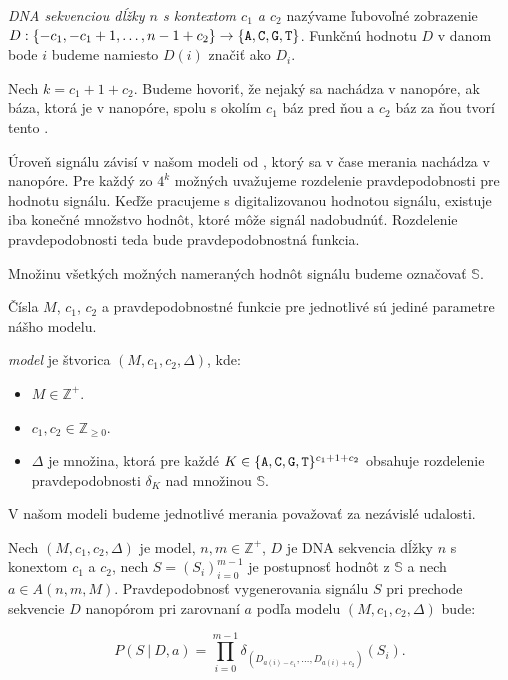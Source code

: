 \begin{definicia}

\emph{DNA sekvenciou dĺžky $n$ s kontextom $c_1$ a $c_2$} nazývame ľubovoľné zobrazenie 
$D: \{-c_1, -c_1+1, \dots, n-1+c_2\} \rightarrow \{\texttt{A}, \texttt{C}, \texttt{G}, \texttt{T}\}$. Funkčnú hodnotu $D$ v danom bode $i$
budeme namiesto $D(i)$ značiť ako $D_i$.

\end{definicia}

Nech $k = c_1 + 1 + c_2$. Budeme hovoriť, že nejaký \kmer{} sa nachádza v nanopóre, ak báza, 
ktorá je v nanopóre, spolu s okolím $c_1$ báz pred ňou a $c_2$ báz za ňou tvorí tento \kmer{}.

Úroveň signálu závisí v našom modeli od , ktorý sa v čase merania nachádza v nanopóre.
Pre každý zo $4^k$ možných  uvažujeme rozdelenie 
pravdepodobnosti pre hodnotu signálu.
Keďže pracujeme s digitalizovanou hodnotou signálu, existuje iba konečné množstvo hodnôt, ktoré
môže signál nadobudnúť. Rozdelenie pravdepodobnosti teda bude pravdepodobnostná funkcia.

\begin{definicia}

Množinu všetkých možných nameraných hodnôt signálu budeme označovať $\mathbb{S}$.

\end{definicia}

Čísla $M$, $c_1$, $c_2$ a pravdepodobnostné funkcie pre jednotlivé  sú jediné
parametre nášho modelu.

\begin{definicia}

\emph{ model} je štvorica $(M, c_1, c_2, \Delta)$, kde:

\begin{itemize}
\item $M \in \mathbb{Z}^+$.
\item $c_1, c_2 \in \mathbb{Z}_{\geq 0}$.
\item $\Delta$ je množina, ktorá pre každé $K \in \{\texttt{A}, \texttt{C}, \texttt{G}, \texttt{T}\}^{c_1 + 1 + c_2}$ obsahuje rozdelenie pravdepodobnosti
$\delta_K$ nad množinou $\mathbb{S}$.
\end{itemize}
\end{definicia}

V našom modeli budeme jednotlivé merania považovať za nezávislé udalosti.

\begin{definicia}

Nech $(M, c_1, c_2, \Delta)$ je  model, $n, m \in \mathbb{Z}^+$, $D$ je DNA sekvencia dĺžky $n$ s konextom
$c_1$ a $c_2$, nech $S = (S_i)_{i=0}^{m-1}$ je postupnosť hodnôt z $\mathbb{S}$ a nech 
$a \in A(n, m, M)$. Pravdepodobnosť vygenerovania signálu $S$ pri prechode sekvencie $D$ nanopórom
pri zarovnaní $a$ podľa modelu $(M, c_1, c_2, \Delta)$ bude:

$$P(S ~|~ D, a) = \prod\limits_{i=0}^{m-1} \delta_{(D_{a(i)-c_1}, \dots, D_{a(i)+c_2})}(S_i) \text{.}$$

\end{definicia}

